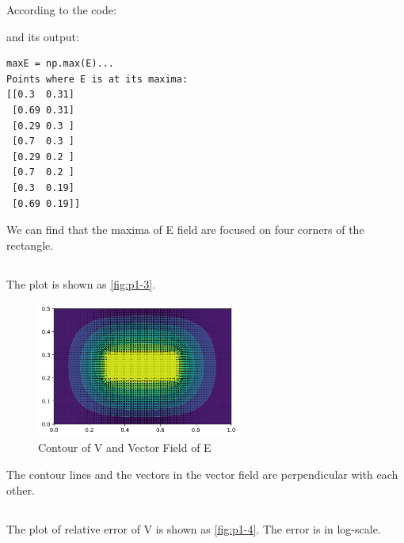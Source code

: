 \documentclass{article}
\begin{document}
        According to the code:

        

        and its output:

        \begin{lstlisting}[style=Python]  
maxE = np.max(E)...
Points where E is at its maxima:
[[0.3  0.31]
 [0.69 0.31]
 [0.29 0.3 ]
 [0.7  0.3 ]
 [0.29 0.2 ]
 [0.7  0.2 ]
 [0.3  0.19]
 [0.69 0.19]]
        \end{lstlisting}

        We can find that the maxima of E field are focused on four corners of the rectangle.

    \subsection{}

        The plot is shown as \autoref{fig:p1-3}.

        \begin{figure}[H]
            \centering
            \includegraphics[width=0.6\textwidth]{img/p1_3.png}
            \caption{Contour of V and Vector Field of E}
            \label{fig:p1-3}
        \end{figure}

        The contour lines and the vectors in the vector field are perpendicular with each other.

    \subsection{}

        The plot of relative error of V is shown as \autoref{fig:p1-4}. The error is in log-scale.
\end{document}
